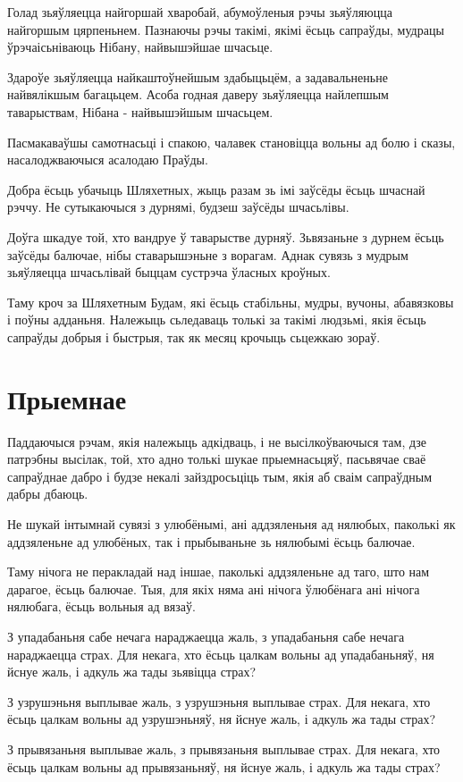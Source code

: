 \documentclass{article}
\begin{document}
Голад зьяўляецца найгоршай хваробай, абумоўленыя рэчы зьяўляюцца
найгоршым цярпеньнем. Пазнаючы рэчы такімі, якімі ёсьць сапраўды,
мудрацы ўрэчаісьніваюць Нібану, найвышэйшае шчасьце.

Здароўе зьяўляецца найкаштоўнейшым здабыцьцём, а задавальненьне
найвялікшым багацьцем. Асоба годная даверу зьяўляецца найлепшым
таварыствам, Нібана - найвышэйшым шчасьцем.

Пасмакаваўшы самотнасьці і спакою, чалавек становіцца вольны ад
болю і сказы, насалоджваючыся асалодаю Праўды.

Добра ёсьць убачыць Шляхетных, жыць разам зь імі заўсёды ёсьць
шчаснай рэччу. Не сутыкаючыся з дурнямі, будзеш заўсёды шчасьлівы.

Доўга шкадуе той, хто вандруе ў таварыстве дурняў. Зьвязаньне з
дурнем ёсьць заўсёды балючае, нібы ставарышэньне з ворагам. Аднак сувязь
з мудрым зьяўляецца шчасьлівай быццам сустрэча ўласных кроўных.

Таму кроч за Шляхетным Будам, які ёсьць стабільны, мудры, вучоны,
абавязковы і поўны адданьня. Належыць сьледаваць толькі за такімі
людзьмі, якія ёсьць сапраўды добрыя і быстрыя, так як месяц крочыць
сьцежкаю зораў.

\section{Прыемнае}

Паддаючыся рэчам, якія належыць адкідваць, і не высілкоўваючыся
там, дзе патрэбны высілак, той, хто адно толькі шукае прыемнасьцяў,
пасьвячае сваё сапраўднае дабро і будзе некалі зайздросьціць тым, якія
аб сваім сапраўдным дабры дбаюць.

Не шукай інтымнай сувязі з улюбёнымі, ані аддзяленьня ад нялюбых,
паколькі як аддзяленьне ад улюбёных, так і прыбываньне зь нялюбымі ёсьць
балючае.

Таму нічога не перакладай над іншае, паколькі аддзяленьне ад таго,
што нам дарагое, ёсьць балючае. Тыя, для якіх няма ані нічога ўлюбёнага
ані нічога нялюбага, ёсьць вольныя ад вязаў.

З упадабаньня сабе нечага нараджаецца жаль, з упадабаньня сабе
нечага нараджаецца страх. Для некага, хто ёсьць цалкам вольны ад
упадабаньняў, ня йснуе жаль, і адкуль жа тады зьявіцца страх?

З узрушэньня выплывае жаль, з узрушэньня выплывае страх. Для
некага, хто ёсьць цалкам вольны ад узрушэньняў, ня йснуе жаль, і адкуль
жа тады страх?

З прывязаньня выплывае жаль, з прывязаньня выплывае страх. Для
некага, хто ёсьць цалкам вольны ад прывязаньняў, ня йснуе жаль, і адкуль
жа тады страх?
\end{document}
